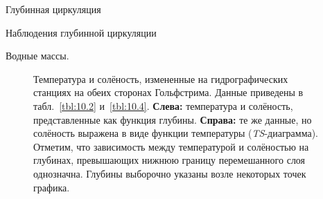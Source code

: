 \begin{chapter}{Глубинная циркуляция}
\begin{section}{Наблюдения глубинной циркуляции}
\begin{paragraph}{Водные массы.}
\begin{figure}[b!]
\caption{Температура и солёность, измененные на гидрографических 
станциях на обеих сторонах
Гольфстрима. Данные приведены
в табл.~\ref{tbl:10.2} и~\ref{tbl:10.4}.  
\textbf{Слева:} температура и солёность, представленные как функция глубины.
\textbf{Справа:} те же данные, но солёность выражена в виде функции 
температуры (\emph{TS}-диаграмма).
Отметим, что зависимость между температурой и солёностью на глубинах,
превышающих нижнюю границу перемешанного 
слоя однозначна.
Глубины выборочно указаны возле некоторых точек графика.}
\label{fig:GulfStreamTSDPlot}
\end{figure}
%


\end{paragraph}
\end{section}
\end{chapter}
